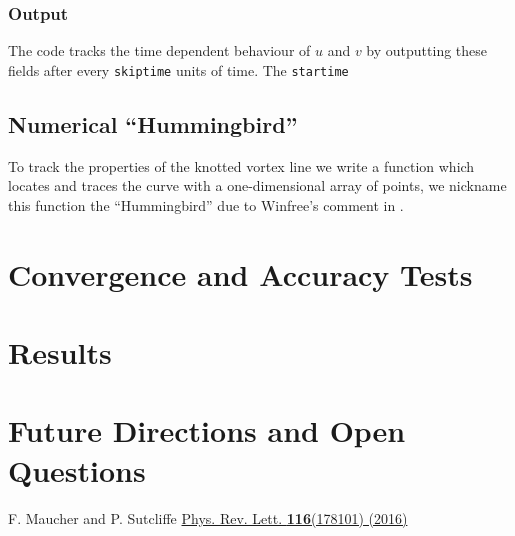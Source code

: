 \documentclass[notitlepage,aps,amsmath,amssymb,11pt]{revtex4-1}
\begin{document}
\subsubsection{Output}

The code tracks the time dependent behaviour of $u$ and $v$ by outputting these fields after every \verb'skiptime' units of time. The \verb'startime'


\subsection{Numerical ``Hummingbird''}

To track the properties of the knotted vortex line we write a function which locates and traces the curve with a one-dimensional array of points, we nickname  this function the ``Hummingbird'' due to Winfree's comment in \cite{Winfree1990}. 

\section{Convergence and Accuracy Tests}

\section{Results}

\section{Future Directions and Open Questions}

\begin{thebibliography}{10}
 F. Maucher and P. Sutcliffe \href{http://dx.doi.org/10.1103/PhysRevLett.116.178101}{Phys. Rev. Lett. {\bf 116}(178101) (2016)}

\end{thebibliography}
\end{document}
